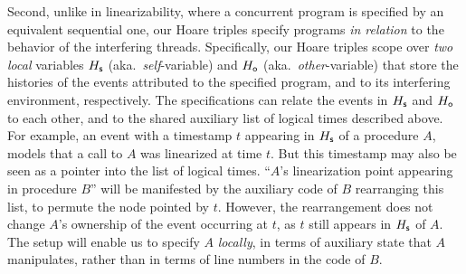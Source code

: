 Second, unlike in linearizability, where a concurrent program is
specified by an equivalent sequential one, our Hoare triples specify
programs \emph{in relation} to the behavior of the interfering
threads. Specifically, our Hoare triples scope over \emph{two}
\emph{local} variables $H_{\mathsf{s}}$ (aka.~\emph{self}-variable) and
$H_{\mathsf{o}}$ (aka.~\emph{other}-variable) that store the histories of the
events attributed to the specified program, and to its interfering
environment, respectively. The specifications can relate the events in
$H_{\mathsf{s}}$ and $H_{\mathsf{o}}$ to each other, and to the shared auxiliary
list of logical times described above. For example, an event with a
timestamp $t$ appearing in $H_{\mathsf{s}}$ of a procedure $A$, models that a
call to $A$ was linearized at time $t$. But this timestamp may also be
seen as a pointer into the list of logical times. ``$A$'s linearization
point appearing in procedure $B$'' will be manifested by the auxiliary code of $B$
rearranging this list, to permute the node pointed by $t$. However, the
rearrangement does not change $A$'s ownership of the event occurring at $t$, as $t$
still appears in $H_{\mathsf{s}}$ of $A$. The setup will enable us to specify
$A$ \emph{locally}, in terms of auxiliary state that $A$ manipulates,
rather than in terms of line numbers in the code of $B$. 



